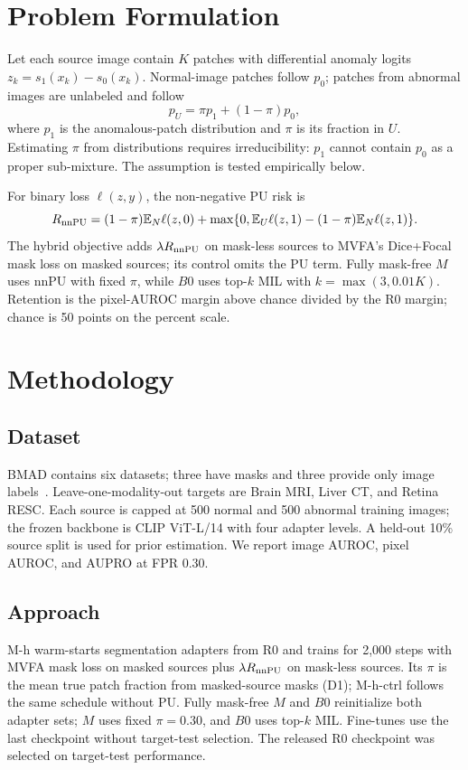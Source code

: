 \documentclass[10pt,twocolumn,letterpaper]{article}
\begin{document}
\section{Problem Formulation}
\label{sec:problem}
Let each source image contain $K$ patches with differential anomaly logits $z_k=s_1(x_k)-s_0(x_k)$. Normal-image patches follow $p_0$; patches from abnormal images are unlabeled and follow
\begin{equation}
p_U=\pi p_1+(1-\pi)p_0,
\label{eq:mixture_dist}
\end{equation}
where $p_1$ is the anomalous-patch distribution and $\pi$ is its fraction in $U$. Estimating $\pi$ from distributions requires irreducibility: $p_1$ cannot contain $p_0$ as a proper sub-mixture. The assumption is tested empirically below.

For binary loss $\ell(z,y)$, the non-negative PU risk is
\begin{equation}
R_{\rm nnPU}=(1-\pi)\mathbb{E}_N\ell(z,0)+\max\{0,\mathbb{E}_U\ell(z,1)-(1-\pi)\mathbb{E}_N\ell(z,1)\}.
\label{eq:nnpu_risk}
\end{equation}
The hybrid objective adds $\lambda R_{\rm nnPU}$ on mask-less sources to MVFA's Dice+Focal mask loss on masked sources; its control omits the PU term. Fully mask-free $M$ uses nnPU with fixed $\pi$, while $B0$ uses top-$k$ MIL with $k=\max(3,0.01K)$. Retention is the pixel-AUROC margin above chance divided by the R0 margin; chance is 50 points on the percent scale.

\section{Methodology}
\label{sec:method}
\subsection{Dataset}
BMAD contains six datasets; three have masks and three provide only image labels~\cite{bmad2024}. Leave-one-modality-out targets are Brain MRI, Liver CT, and Retina RESC. Each source is capped at 500 normal and 500 abnormal training images; the frozen backbone is CLIP ViT-L/14 with four adapter levels. A held-out 10\% source split is used for prior estimation. We report image AUROC, pixel AUROC, and AUPRO at FPR $0.30$.

\subsection{Approach}
M-h warm-starts segmentation adapters from R0 and trains for 2,000 steps with MVFA mask loss on masked sources plus $\lambda R_{\rm nnPU}$ on mask-less sources. Its $\pi$ is the mean true patch fraction from masked-source masks (D1); M-h-ctrl follows the same schedule without PU. Fully mask-free $M$ and $B0$ reinitialize both adapter sets; $M$ uses fixed $\pi=0.30$, and $B0$ uses top-$k$ MIL. Fine-tunes use the last checkpoint without target-test selection. The released R0 checkpoint was selected on target-test performance.
\end{document}
